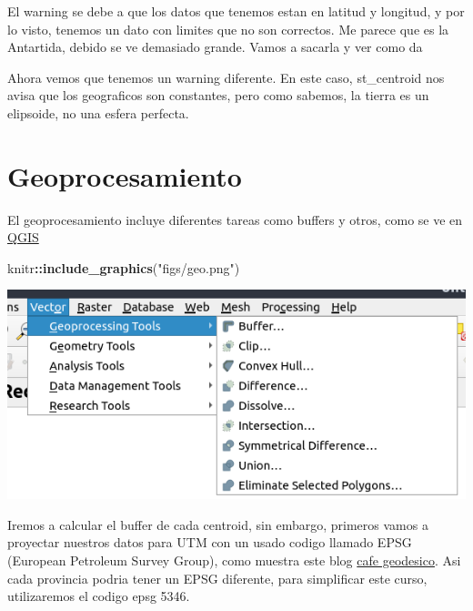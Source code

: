 \documentclass[]{book}
\newenvironment{Shaded}{\begin{snugshade}}{\end{snugshade}}
\newcommand{\KeywordTok}[1]{\textcolor[rgb]{0.13,0.29,0.53}{\textbf{#1}}}
\newcommand{\NormalTok}[1]{#1}
\newcommand{\OperatorTok}[1]{\textcolor[rgb]{0.81,0.36,0.00}{\textbf{#1}}}
\newcommand{\StringTok}[1]{\textcolor[rgb]{0.31,0.60,0.02}{#1}}
\begin{document}
El warning se debe a que los datos que tenemos estan en latitud y longitud, y por lo visto, tenemos un dato con limites que no son correctos. Me parece que es la Antartida, debido se ve demasiado grande. Vamos a sacarla y ver como da

\begin{Shaded}
\end{Shaded}

Ahora vemos que tenemos un warning diferente. En este caso, st\_centroid nos avisa que los geograficos son constantes, pero como sabemos, la tierra es un elipsoide, no una esfera perfecta.

\hypertarget{geoprocesamiento}{%
\section{Geoprocesamiento}\label{geoprocesamiento}}

El geoprocesamiento incluye diferentes tareas como buffers y otros, como se ve en \href{https://qgis.org}{QGIS}

\begin{Shaded}
\begin{Highlighting}[]
\NormalTok{knitr}\OperatorTok{::}\KeywordTok{include_graphics}\NormalTok{(}\StringTok{"figs/geo.png"}\NormalTok{)}
\end{Highlighting}
\end{Shaded}

\includegraphics[width=8.01in,height=1.5\textheight]{figs/geo}

Iremos a calcular el buffer de cada centroid, sin embargo, primeros vamos a proyectar nuestros datos para UTM con un usado codigo llamado EPSG (European Petroleum Survey Group), como muestra este blog \href{https://cafegeodesico.blogspot.com/2011/12/que-son-los-codigos-epsg.html}{cafe geodesico}. Asi cada provincia podria tener un EPSG diferente, para simplificar este curso, utilizaremos el codigo epsg 5346.
\end{document}
